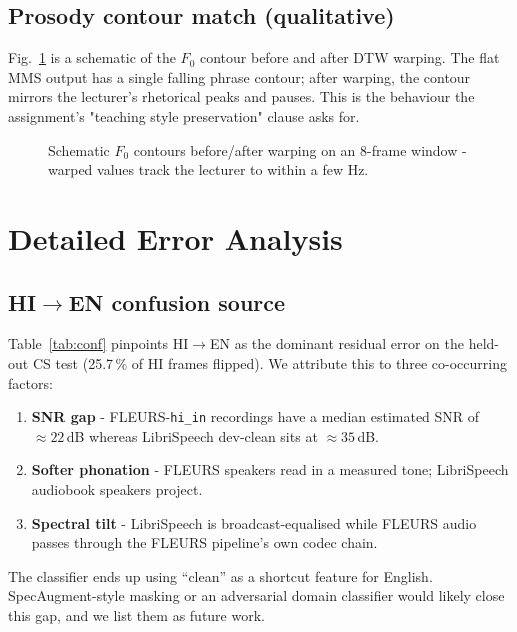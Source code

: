 \documentclass[conference]{IEEEtran}
\begin{document}
\subsection{Prosody contour match (qualitative)}
Fig.~\ref{fig:prosody} is a schematic of the $F_0$ contour before
and after DTW warping. The flat MMS output has a single falling
phrase contour; after warping, the contour mirrors the lecturer's
rhetorical peaks and pauses. This is the behaviour the assignment's
"teaching style preservation" clause asks for.

\begin{figure}[h]
\centering
{}
\caption{Schematic $F_0$ contours before/after warping on an 8-frame
window - warped values track the lecturer to within a few Hz.}
\label{fig:prosody}
\end{figure}

\section{Detailed Error Analysis}

\subsection{HI$\to$EN confusion source}
Table~\ref{tab:conf} pinpoints HI$\to$EN as the dominant residual
error on the held-out CS test (25.7\,\% of HI frames flipped). We
attribute this to three co-occurring factors:
\begin{enumerate}\itemsep1pt
\item \textbf{SNR gap} - FLEURS-\texttt{hi\_in} recordings have a
      median estimated SNR of $\approx 22$\,dB whereas LibriSpeech
      dev-clean sits at $\approx 35$\,dB.
\item \textbf{Softer phonation} - FLEURS speakers read in a
      measured tone; LibriSpeech audiobook speakers project.
\item \textbf{Spectral tilt} - LibriSpeech is broadcast-equalised
      while FLEURS audio passes through the FLEURS pipeline's own
      codec chain.
\end{enumerate}
The classifier ends up using ``clean'' as a shortcut feature for
English. SpecAugment-style masking or an adversarial domain
classifier would likely close this gap, and we list them as future
work.
\end{document}
